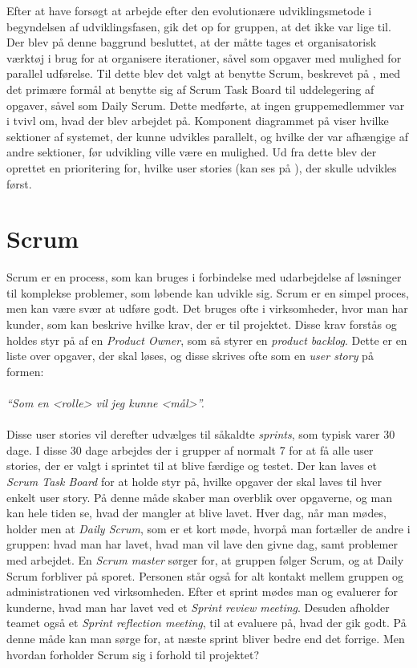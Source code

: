 Efter at have forsøgt at arbejde efter den evolutionære udviklingsmetode i begyndelsen af udviklingsfasen, gik det op for gruppen, at det ikke var lige til.
Der blev på denne baggrund besluttet, at der måtte tages et organisatorisk værktøj i brug for at organisere iterationer, såvel som opgaver med mulighed for parallel udførelse.
Til dette blev det valgt at benytte Scrum, beskrevet på , med det primære formål at benytte sig af Scrum Task Board til uddelegering af opgaver, såvel som Daily Scrum. 
Dette medførte, at ingen gruppemedlemmer var i tvivl om, hvad der blev arbejdet på.
Komponent diagrammet på  viser hvilke sektioner af systemet, der kunne udvikles parallelt, og hvilke der var afhængige af andre sektioner, før udvikling ville være en mulighed.
Ud fra dette blev der oprettet en prioritering for, hvilke user stories (kan ses på ), der skulle udvikles først.

\section{Scrum}\label{scrum}
Scrum er en process, som kan bruges i forbindelse med udarbejdelse af løsninger til komplekse problemer, som løbende kan udvikle sig. 
Scrum er en simpel proces, men kan være svær at udføre godt.
Det bruges ofte i virksomheder, hvor man har kunder, som kan beskrive hvilke krav, der er til projektet.
Disse krav forstås og holdes styr på af en \textit{Product Owner}, som så styrer en \textit{product backlog}.
Dette er en liste over opgaver, der skal løses, og disse skrives ofte som en \textit{user story} på formen:\\ \\ \textit{``Som en <rolle> vil jeg kunne <mål>''. }\\ \\
Disse user stories vil derefter udvælges til såkaldte \textit{sprints}, som typisk varer 30 dage. 
I disse 30 dage arbejdes der i grupper af normalt 7 for at få alle user stories, der er valgt i sprintet til at blive færdige og testet.
Der kan laves et \textit{Scrum Task Board} for at holde styr på, hvilke opgaver der skal laves til hver enkelt user story. 
På denne måde skaber man overblik over opgaverne, og man kan hele tiden se, hvad der mangler at blive lavet.
Hver dag, når man mødes, holder men at \textit{Daily Scrum}, som er et kort møde, hvorpå man fortæller de andre i gruppen: hvad man har lavet, hvad man vil lave den givne dag, samt problemer med arbejdet.
En \textit{Scrum master} sørger for, at gruppen følger Scrum, og at Daily Scrum forbliver på sporet. 
Personen står også for alt kontakt mellem gruppen og administrationen ved virksomheden.
Efter et sprint mødes man og evaluerer for kunderne, hvad man har lavet ved et \textit{Sprint review meeting}.
Desuden afholder teamet også et \textit{Sprint reflection meeting}, til at evaluere på, hvad der gik godt.
På denne måde kan man sørge for, at næste sprint bliver bedre end det forrige. \citep{A&I_DEV}
Men hvordan forholder Scrum sig i forhold til projektet?

